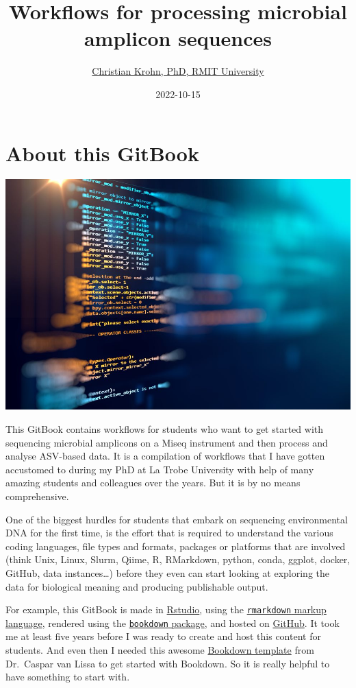 \documentclass[
]{book}
\title{Workflows for processing microbial amplicon sequences}
\author{\href{https://www.rmit.edu.au/contact/staff-contacts/academic-staff/k/krohn---christian}{Christian Krohn, PhD, RMIT University}}
\date{2022-10-15}
\begin{document}
\maketitle

{
\setcounter{tocdepth}{1}
\tableofcontents
}
\hypertarget{about}{%
\chapter{About this GitBook}\label{about}}

\includegraphics{./img/data.jpeg}

This GitBook contains workflows for students who want to get started with sequencing microbial amplicons on a Miseq instrument and then process and analyse ASV-based data. It is a compilation of workflows that I have gotten accustomed to during my PhD at La Trobe University with help of many amazing students and colleagues over the years. But it is by no means comprehensive.

One of the biggest hurdles for students that embark on sequencing environmental DNA for the first time, is the effort that is required to understand the various coding languages, file types and formats, packages or platforms that are involved (think Unix, Linux, Slurm, Qiime, R, RMarkdown, python, conda, ggplot, docker, GitHub, data instances\ldots) before they even can start looking at exploring the data for biological meaning and producing publishable output.

For example, this GitBook is made in \href{https://rstudio.com}{Rstudio}, using the \href{https://rmarkdown.rstudio.com/}{\texttt{rmarkdown} markup language}, rendered using the \href{https://bookdown.org/yihui/bookdown/get-started.html}{\texttt{bookdown} package}, and hosted on \href{https://github.com/}{GitHub}. It took me at least five years before I was ready to create and host this content for students. And even then I needed this awesome \href{https://cjvanlissa.github.io/gitbook-demo/index.html}{Bookdown template} from Dr.~Caspar van Lissa to get started with Bookdown. So it is really helpful to have something to start with.
\end{document}
